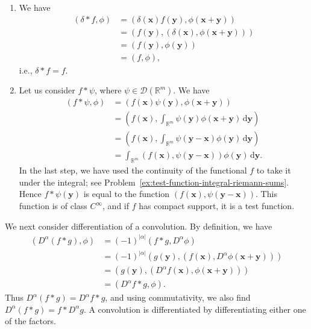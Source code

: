 \begin{enumerate}\item We have
\begin{equation}\label{eq:delta-convolution-identity-pairing}
\begin{aligned}
(\delta*f,\phi)&=(\delta(\bm{x})f(\bm{y}),\phi(\bm{x}+\bm{y}))\\
&=(f(\bm{y}),(\delta(\bm{x}),\phi(\bm{x}+\bm{y})))\\
&=(f(\bm{y}),\phi(\bm{y}))\\
&=(f,\phi),
\end{aligned}
\end{equation}
i.e., $\delta*f=f$.
\item Let us consider $f*\psi$, where $\psi\in\mathcal{D}(\mathbb{R}^m)$. We have
\begin{equation}\label{eq:distribution-test-convolution-smooth-pairing}
\begin{aligned}
(f*\psi,\phi)&=(f(\bm{x})\psi(\bm{y}),\phi(\bm{x}+\bm{y}))\\
&=\left(f(\bm{x}),\int_{\mathbb{R}^m}\psi(\bm{y})\phi(\bm{x}+\bm{y})\,\mathrm{d}\bm{y}\right)\\
&=\left(f(\bm{x}),\int_{\mathbb{R}^m}\psi(\bm{y}-\bm{x})\phi(\bm{y})\,\mathrm{d}\bm{y}\right)\\
&=\int_{\mathbb{R}^m}(f(\bm{x}),\psi(\bm{y}-\bm{x}))\phi(\bm{y})\,\mathrm{d}\bm{y}.
\end{aligned}
\end{equation}
In the last step, we have used the continuity of the functional $f$ to take it under the integral; see Problem~\ref{ex:test-function-integral-riemann-sums}. Hence $f*\psi(\bm{y})$ is equal to the function $(f(\bm{x}),\psi(\bm{y}-\bm{x}))$. This function is of class $C^\infty$, and if $f$ has compact support, it is a test function.
\end{enumerate}

We next consider differentiation of a convolution. By definition, we have
\begin{equation}\label{eq:distribution-convolution-derivative-pairing}
\begin{aligned}
(D^\alpha(f*g),\phi)&=(-1)^{|\alpha|}(f*g,D^\alpha\phi)\\
&=(-1)^{|\alpha|}(g(\bm{y}),(f(\bm{x}),D^\alpha\phi(\bm{x}+\bm{y})))\\
&=(g(\bm{y}),(D^\alpha f(\bm{x}),\phi(\bm{x}+\bm{y})))\\
&=(D^\alpha f*g,\phi).
\end{aligned}
\end{equation}
Thus $D^\alpha(f*g)=D^\alpha f*g$, and using commutativity, we also find $D^\alpha(f*g)=f*D^\alpha g$. A convolution is differentiated by differentiating either one of the factors.

